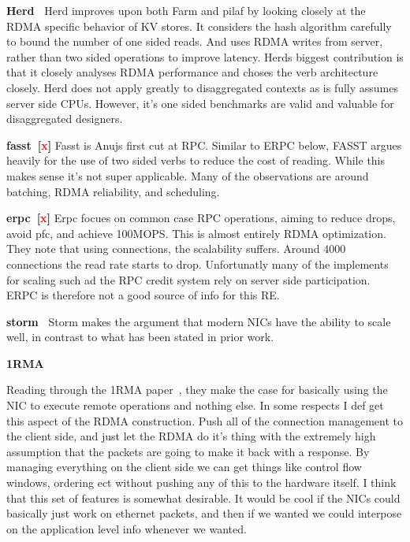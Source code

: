 \textbf{Herd~\cite{herd}} Herd improves upon both Farm and pilaf by looking
closely at the RDMA specific behavior of KV stores. It considers the hash
algorithm carefully to bound the number of one sided reads. And uses RDMA writes
from server, rather than two sided operations to improve latency. Herds biggest
contribution is that it closely analyses RDMA performance and choses the verb
architecture closely. Herd does not apply greatly to disaggregated contexts as
is fully assumes server side CPUs. However, it's one sided benchmarks are valid
and valuable for disaggregated designers.

\textbf{fasst~\cite{faast}[\textcolor{red}{x}]} Fasst is Anujs first cut at RPC.
Similar to ERPC below, FASST argues heavily for the use of two sided verbs to
reduce the cost of reading. While this makes sense it's not super applicable.
Many of the observations are around batching, RDMA reliability, and scheduling.

\textbf{erpc~\cite{erpc}[\textcolor{red}{x}]} Erpc focues on common case RPC
operations, aiming to reduce drops, avoid pfc, and achieve 100MOPS. This is
almost entirely RDMA optimization. They note that using connections, the
scalability suffers. Around 4000 connections the read rate starts to drop.
Unfortunatly many of the implements for scaling such ad the RPC credit system
rely on server side participation. ERPC is therefore not a good source of info
for this RE.


\textbf{storm~\cite{storm}} Storm makes the argument that modern NICs have the
ability to scale well, in contrast to what has been stated in prior work.

\textbf{1RMA~\cite{1rma}}

Reading through the 1RMA paper~\cite{1rma}, they make the case for basically
using the NIC to execute remote operations and nothing else. In some respects I
def get this aspect of the RDMA construction. Push all of the connection
management to the client side, and just let the RDMA do it's thing with the
extremely high assumption that the packets are going to make it back with a
response. By managing everything on the client side we can get things like
control flow windows, ordering ect without pushing any of this to the hardware
itself. I think that this set of features is somewhat desirable. It would be
cool if the NICs could basically just work on ethernet packets, and then if we
wanted we could interpose on the application level info whenever we wanted.


